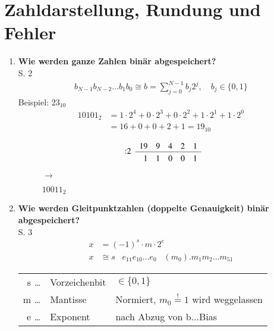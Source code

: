 \section{Zahldarstellung, Rundung und Fehler}
	\begin{enumerate}
		\item \textbf{Wie werden ganze Zahlen binär abgespeichert?}\\
			S. 2
			\begin{align*}
				b_{N-1}b_{N-2}\dots b_{1}b_{0} \cong b = \sum_{j=0}^{N-1}b_j2^j, \quad b_j\in\{0,1\}
			\end{align*}
			Beispiel: $23_{10}$
			\begin{align*}
					10101_2 &= 1\cdot2^4+0\cdot2^3+0\cdot2^2+1\cdot2^1+1\cdot2^0 \\
					      &= 16+0+0+2+1 = 19_{10}
			\end{align*} \vspace{-1cm}
			\begin{figure}[htbp]
				\centering
				\begin{minipage}{0.3\textwidth}
					\centering
					$$\begin{array}{rrrrrr}
					\multirow{2}{*}{:2} & 19 & 9 & 4 & 2 & 1 \\
					\cline{2-6}
					 \rule{0pt}{2.5ex} & 1 &  1 & 0 & 0 & 1
					\end{array}$$
				\end{minipage}\hspace{-0.5cm}
				\begin{minipage}{0.01\textwidth}
					\centering
					$\rightarrow$
				\end{minipage}\hspace{-0.7cm}
				\begin{minipage}{0.2\textwidth}
					\centering
					$10011_2$
				\end{minipage}
			\end{figure}
			
			
		\item \textbf{Wie werden Gleitpunktzahlen (doppelte Genauigkeit) binär abgespeichert?}\\
		S. 3
			\begin{align*}
				x &= (-1)^s \cdot m \cdot 2^e \\
				x &\cong s \;\;\; e_{11}e_{10}\dots e_0 \;\;\; (m_0).m_1m_2\dots m_{51}
			\end{align*}\vspace{-0.5cm}
			\begin{table}[htbp]
				\centering
				\begin{tabular}[htpb]{rll}
					s \; \dots \!\!\! & Vorzeichenbit &$\in \{0,1\}$\\
					m \; \dots \!\!\! & Mantisse & Normiert, $m_0\overset{!}{=}1$ wird weggelassen\\
					e \; \dots \!\!\! & Exponent & nach Abzug von b$\dots$Bias 
				\end{tabular}
			\end{table}
		

\end{enumerate}
